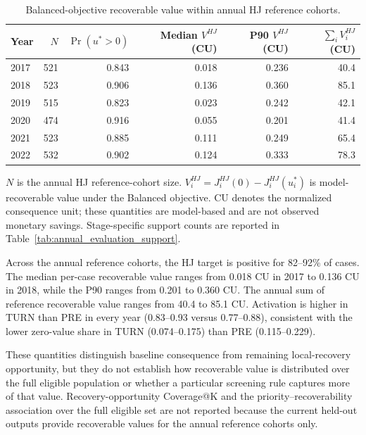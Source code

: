 \begin{table}[pos=t]
\centering
\caption{Balanced-objective recoverable value within annual HJ reference cohorts.}
\label{tab:stage2_recovery_profile}
\small
\setlength{\tabcolsep}{5pt}
\begin{tabular}{lrrrrr}
\toprule
Year & $N$ & $\Pr(u^*>0)$ & Median $V^{HJ}$ (CU) & P90 $V^{HJ}$ (CU) & $\sum_i V_i^{HJ}$ (CU) \\
\midrule
2017 & 521 & 0.843 & 0.018 & 0.236 & 40.4 \\
2018 & 523 & 0.906 & 0.136 & 0.360 & 85.1 \\
2019 & 515 & 0.823 & 0.023 & 0.242 & 42.1 \\
2020 & 474 & 0.916 & 0.055 & 0.201 & 41.4 \\
2021 & 523 & 0.885 & 0.111 & 0.249 & 65.4 \\
2022 & 532 & 0.902 & 0.124 & 0.333 & 78.3 \\
\bottomrule
\end{tabular}
\par\vspace{3pt}
\begin{minipage}{0.98\linewidth}
\footnotesize
$N$ is the annual HJ reference-cohort size. $V_i^{HJ}=J_i^{HJ}(0)-J_i^{HJ}(u_i^*)$ is model-recoverable value under the Balanced objective. CU denotes the normalized consequence unit; these quantities are model-based and are not observed monetary savings. Stage-specific support counts are reported in Table~\ref{tab:annual_evaluation_support}.
\end{minipage}
\end{table}

Across the annual reference cohorts, the HJ target is positive for 82--92\% of cases. The median per-case recoverable value ranges from 0.018 CU in 2017 to 0.136 CU in 2018, while the P90 ranges from 0.201 to 0.360 CU. The annual sum of reference recoverable value ranges from 40.4 to 85.1 CU. Activation is higher in TURN than PRE in every year (0.83--0.93 versus 0.77--0.88), consistent with the lower zero-value share in TURN (0.074--0.175) than PRE (0.115--0.229).

These quantities distinguish baseline consequence from remaining local-recovery opportunity, but they do not establish how recoverable value is distributed over the full eligible population or whether a particular screening rule captures more of that value. Recovery-opportunity Coverage@K and the priority--recoverability association over the full eligible set are not reported because the current held-out outputs provide recoverable values for the annual reference cohorts only.

